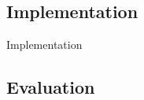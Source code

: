 \subsection{Implementation}


\begin{frame}{Implementation}

  \begin{center}
    
  \end{center}
  
\end{frame}



\subsection{Evaluation}

